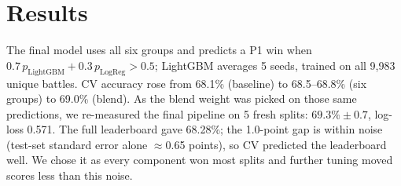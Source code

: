 \section{Results}
\noindent{}\hfill
{}\hfill
{}\par\medskip
The final model uses all six groups and predicts a P1 win when $0.7\,p_{\text{LightGBM}} + 0.3\,p_{\text{LogReg}} > 0.5$; LightGBM averages 5 seeds, trained on all 9{,}983 unique battles.
CV accuracy rose from 68.1\% (baseline) to 68.5--68.8\% (six groups) to 69.0\% (blend). As the blend weight was picked on those same predictions, we re-measured the final pipeline on 5 fresh splits: $69.3\% \pm 0.7$, log-loss 0.571.
The full leaderboard gave 68.28\%; the 1.0-point gap is within noise (test-set standard error alone $\approx$0.65 points), so CV predicted the leaderboard well.
We chose it as every component won most splits and further tuning moved scores less than this noise.
